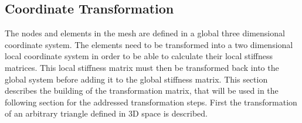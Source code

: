  \subsection{Coordinate Transformation} %
  The nodes and elements in the mesh are defined in a global three dimensional coordinate system. The elements need to be transformed into a two dimensional local coordinate system in order to be able to calculate their local stiffness matrices. This local stiffness matrix must then be transformed back into the global system before adding it to the global stiffness matrix. This section describes the building of the transformation matrix, that will be used in the following section for the addressed transformation steps.
  First the transformation of an arbitrary triangle defined in 3D space is described.
 
  
